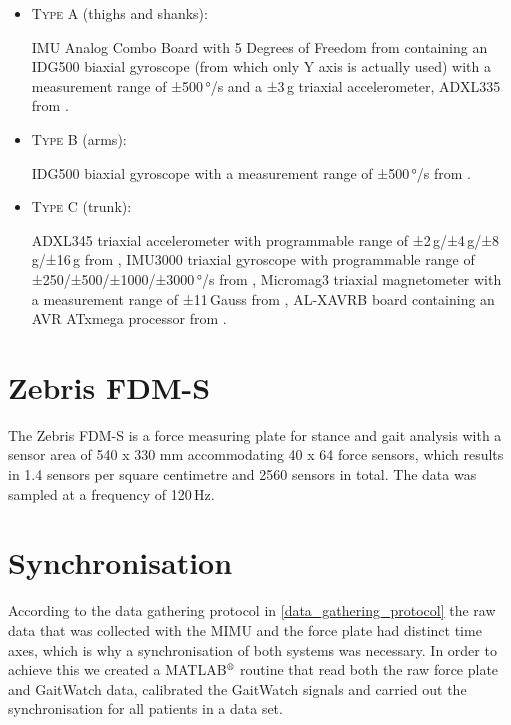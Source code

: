 \begin{itemize}

\item \textsc{Type A} (thighs and shanks): 

IMU Analog Combo Board with 5 Degrees of Freedom from  \cite{IMU5} containing an IDG500 biaxial gyroscope (from which only Y axis is actually used) with a measurement range of ±500\,°/s \cite{IDG500} and a ±3\,g triaxial accelerometer, ADXL335 from  \cite{ADXL335}.

\item \textsc{Type B} (arms):

IDG500 biaxial gyroscope with a measurement range of ±500\,°/s from  \cite{IDG500}.

\vfill

\item \textsc{Type C} (trunk):

ADXL345 triaxial accelerometer with programmable range of ±2\,g/±4\,g/±8\,g/±16\,g from  \cite{ADXL345},
IMU3000 triaxial gyroscope with programmable range of ±250/±500/±1000/±3000\,°/s from  \cite{IMU3000}, 
Micromag3 triaxial magnetometer with a measurement range of ±11\,Gauss from  \cite{MicroMag3}, AL-XAVRB board containing an AVR ATxmega processor from  \cite{AVRATxmega}.

\end{itemize}


\section{Zebris FDM-S}

The Zebris FDM-S \cite{zebris_force_plate_2013} is a force measuring plate for stance and gait analysis with a sensor area of 540 x 330 mm accommodating 40 x 64 force sensors, which results in 1.4 sensors per square centimetre and 2560 sensors in total. The data was sampled at a frequency of 120\,Hz.

\section{Synchronisation}

According to the data gathering protocol in \ref{data_gathering_protocol} the raw data that was collected with the MIMU and the force plate had distinct time axes, which is why a synchronisation of both systems was necessary. In order to achieve this we created a MATLAB$\textsuperscript{\textregistered}$ routine that read both the raw force plate and GaitWatch data, calibrated the GaitWatch signals and carried out the synchronisation for all patients in a data set.

